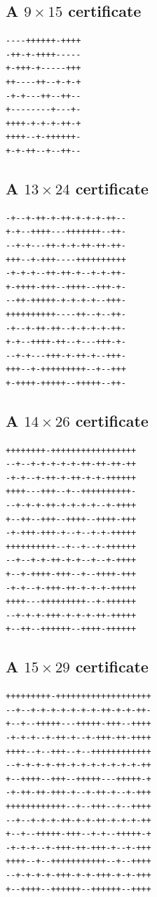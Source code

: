 \documentclass[11pt]{article}
\theoremstyle{plain}
\theoremstyle{definition}
\begin{document}
\noindent\begin{minipage}[t]{0.48\textwidth}
\vspace{0pt}
\subsection{A \texorpdfstring{\(9\times15\)}{9x15} certificate}
\begingroup\footnotesize
\begin{verbatim}
----++++++-++++
-++-+-++++-----
+-+++-+-----+++
++----++--+-+-+
-+-+---++--++--
+--------+---+-
++++-+-+-+-++-+
++++--+-++++++-
+-+-++--+--++--
\end{verbatim}
\endgroup

\subsection{A \texorpdfstring{\(13\times24\)}{13x24} certificate}
\begingroup\footnotesize
\begin{verbatim}
-+--+-++-+-++-+-+-+-++--
+-+--++++---+++++++--++-
--+-+---++-+-+-++-++-++-
+++--+-+++----++++++++++
-+-+-+--++-++-+--+-+-++-
+-++++-+++--++++--+++-+-
--++-+++++-+-+-+-+--+++-
++++++++++----++--+--++-
-+--+-++-++--+-+-+-+-++-
+-+--++++-++--+---+++-+-
--+-+---+++-+-++-+--+++-
+++--+-+++++++++--+--+++
+-++++-+++++--+++++--++-
\end{verbatim}
\endgroup

\end{minipage}\hfill
\begin{minipage}[t]{0.48\textwidth}
\vspace{0pt}
\subsection{A \texorpdfstring{\(14\times26\)}{14x26} certificate}
\begingroup\footnotesize
\begin{verbatim}
++++++++-+++++++++++++++++
--+--+-+-+-+-+-++-++-++-++
-+-+--+-++-+-++-+-+-++++++
++++---+++--+--++++++++++-
--+-+-+-++-+-+-+-+--+-++++
+--++--+++--++++--++++-+++
-+-+++-+++-+--+--+-+-+++++
++++++++++--+--+--+-++++++
--+--+-+-++-+-+--+--+-++++
+--+-++++-+++--+--++++-+++
-+-+--+-+++-++-+-+-+-+++++
++++---+++++++++--+-++++++
--+-+-+-+++-+-+-+-++-+++++
+--++--++++++--++++-++++++
\end{verbatim}
\endgroup

\subsection{A \texorpdfstring{\(15\times29\)}{15x29} certificate}
\begingroup\footnotesize
\begin{verbatim}
+++++++++-+++++++++++++++++++
--+--+-+-+-+-+-+-+-++-+-+-++-
+--+--+++++---+++++-+++--++++
-+-+-+--+-++-+--+-+++-++-++++
++++--+--+++--+--++++++++++++
--+-+-+-+-++-+-+-+-+-+-+-+-++
+--++++--+++--+++++---+++++-+
-+-++-++-+++-+--+-++-+--+-+++
++++++++++++--+--+++--+--++++
--+--+-+-+-++-+-+-++-+-+-+-++
+--+--+++++-+++--+-+--+++++-+
-+-+-+--+-+++-++-+++-+--+-+++
++++--+--+++++++++++--+--++++
--+-+-+-+-+++-+-+-+++-+-+-+++
+--++++--++++++--++++++--++++
\end{verbatim}
\endgroup
\end{minipage}
\end{document}
